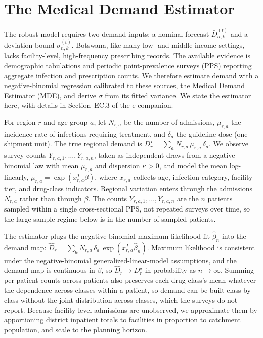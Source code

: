 \documentclass[11pt]{article}
\begin{document}
\section{The Medical Demand Estimator}
\label{sec:demand}

The robust model requires two demand inputs: a nominal forecast $\bar D_{n,k}^{(t)}$ and a deviation bound $\sigma_{n,k}^{(t)}$.
Botswana, like many low- and middle-income settings, lacks facility-level, high-frequency prescribing records.
The available evidence is demographic tabulations and periodic point-prevalence surveys (PPS) \citep{pps2019} reporting aggregate infection and prescription counts.
We therefore estimate demand with a negative-binomial regression calibrated to these sources, the Medical Demand Estimator (MDE), and derive $\sigma$ from its fitted variance.
We state the estimator here, with details in Section~EC.3 of the e-companion.

For region $r$ and age group $a$, let $N_{r,a}$ be the number of admissions, $\mu_{r,a}$ the incidence rate of infections requiring treatment, and $\delta_a$ the guideline dose (one shipment unit).
The true regional demand is $D_r^{\star} = \sum_a N_{r,a}\,\mu_{r,a}\,\delta_a$.
We observe survey counts $Y_{r,a,1},\dots,Y_{r,a,n}$, taken as independent draws from a negative-binomial law with mean $\mu_{r,a}$ and dispersion $\kappa>0$, and model the mean log-linearly, $\mu_{r,a} = \exp(x_{r,a}^{T}\beta)$, where $x_{r,a}$ collects age, infection-category, facility-tier, and drug-class indicators.
Regional variation enters through the admissions $N_{r,a}$ rather than through $\beta$.
The counts $Y_{r,a,1},\dots,Y_{r,a,n}$ are the $n$ patients sampled within a single cross-sectional PPS, not repeated surveys over time, so the large-sample regime below is in the number of sampled patients.

The estimator plugs the negative-binomial maximum-likelihood fit $\hat\beta_n$ into the demand map: $\hat D_r = \sum_a N_{r,a}\,\delta_a\,\exp(x_{r,a}^{T}\hat\beta_n)$.
Maximum likelihood is consistent under the negative-binomial generalized-linear-model assumptions, and the demand map is continuous in $\beta$, so $\hat D_r \to D_r^{\star}$ in probability as $n\to\infty$.
Summing per-patient counts across patients also preserves each drug class's mean whatever the dependence across classes within a patient, so demand can be built class by class without the joint distribution across classes, which the surveys do not report.
Because facility-level admissions are unobserved, we approximate them by apportioning district inpatient totals to facilities in proportion to catchment population, and scale to the planning horizon.
\end{document}
